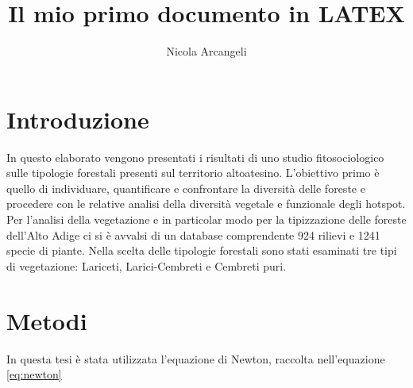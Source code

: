 \documentclass[12]{article}
\title{Il mio primo documento in LATEX}
\author{Nicola Arcangeli}
\begin{document}
\maketitle

\tableofcontents

\listoffigures

\section{Introduzione} \label{sec:intro}
In questo elaborato vengono presentati i risultati di uno studio fitosociologico sulle 
tipologie forestali presenti sul territorio altoatesino. L’obiettivo primo è quello di individuare, 
quantificare e confrontare la diversità delle foreste e procedere con le relative analisi della 
\smallskip %
diversità vegetale e funzionale degli hotspot. Per l’analisi della vegetazione e in particolar modo 
per la tipizzazione delle foreste dell’Alto Adige ci si è avvalsi di un database comprendente 924 
rilievi e 1241 specie di piante. Nella scelta delle tipologie forestali sono stati esaminati tre tipi 
di vegetazione: Lariceti, Larici-Cembreti e Cembreti puri.

\section{Metodi}
In questa tesi è stata utilizzata l'equazione di Newton, raccolta nell'equazione \ref{eq:newton} %
\end{document}
